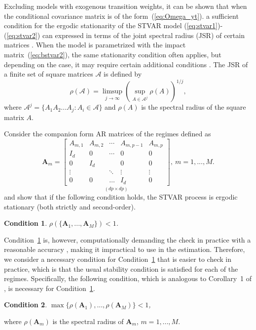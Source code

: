 \documentclass[nojss]{jss}
\newtheorem{condition}{Condition}
\begin{document}
Excluding models with exogenous transition weights, it can be shown that when the conditional covariance matrix is of the form~(\ref{eq:Omega_yt}). a sufficient condition for the ergodic stationarity of the STVAR model (\ref{eq:stvar1})-(\ref{eq:stvar2}) can expressed in terms of the joint spectral radius (JSR) of certain matrices \citep{Kheifets+Saikkonen:2020}. When the model is parametrized with the impact matrix~(\ref{eq:bstvar2}), the same stationarity condition often applies, but depending on the case, it may require certain additional conditions \citep[see][for details]{Virolainen2:2024}. The JSR of a finite set of square matrices $\mathcal{A}$ is defined by
\begin{equation}
\rho(\mathcal{A}) = \underset{j\rightarrow \infty}{\limsup}\left(\underset{A\in \mathcal{A}^j}{\sup}\rho(A) \right)^{1/j},
\end{equation}
where $\mathcal{A}^j=\lbrace A_1A_2...A_j:A_i\in\mathcal{A}\rbrace$ and $\rho(A)$ is the spectral radius of the square matrix $A$.

Consider the companion form AR matrices of the regimes defined as
\begin{equation}\label{eq:boldA}
\boldsymbol{A}_m =
\underset{(dp\times dp)}{\begin{bmatrix}
A_{m,1} & A_{m,2} & \cdots & A_{m,p-1} & A_{m,p} \\
I_d  & 0     & \cdots & 0            & 0 \\
0     & I_d  &             & 0            & 0 \\
\vdots &   & \ddots & \vdots    & \vdots \\
0     & 0     & \hdots & I_d         & 0
\end{bmatrix}}, \
m=1,...,M.
\end{equation}
\citet[][Theorem 1]{Kheifets+Saikkonen:2020} and \cite{Lanne+Virolainen:2024} \citep[see also][]{Saikkonen:2008} show that if the following condition holds, the STVAR process is ergodic stationary (both strictly and second-order).
\begin{condition}\label{cond:sufficient}
$\rho(\lbrace \boldsymbol{A}_1,...,\boldsymbol{A}_M \rbrace) < 1$.
\end{condition}

Condition~\ref{cond:sufficient} is, however, computationally demanding the check in practice with a reasonable accuracy \citep[e.g.,][]{Chang+Blondel:2013}, making it impractical to use in the estimation. Therefore, we consider a necessary condition for Condition~\ref{cond:sufficient} that is easier to check in practice, which is that the usual stability condition is satisfied for each of the regimes. Specifically, the following condition, which is analogous to Corollary~1 of \cite{Kheifets+Saikkonen:2020}, is necessary for Condition~\ref{cond:sufficient}.
\begin{condition}\label{cond:necessary}
$\max\lbrace \rho(\boldsymbol{A}_1),...,\rho(\boldsymbol{A}_M)\rbrace<1$,
\end{condition}
where $\rho(\boldsymbol{A}_m)$ is the spectral radius of $\boldsymbol{A}_m$, $m=1,...,M$.
\end{document}
